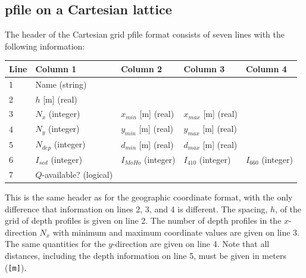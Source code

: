 \documentclass[11pt]{report}
\begin{document}
\subsection{pfile on a Cartesian lattice}
The header of the Cartesian grid pfile format consists of seven lines with the following information:
\begin{center}
\begin{tabular}{lllll}\hline
Line & Column 1& Column 2& Column 3& Column 4\\ \hline
1 & Name (string) & & & \\ \hline
2 & $h$ [m] (real) & & & \\ \hline
3 & $N_{x}$ (integer) & $x_{min}$ [m] (real) & $x_{max}$ [m] (real) & \\ \hline
4 & $N_{y}$ (integer) & $y_{min}$ [m] (real) & $y_{max}$ [m] (real) & \\ \hline
5 & $N_{dep}$ (integer) & $d_{min}$ [m] (real) & $d_{max}$ [m] (real) & \\ \hline
6 & $I_{sed}$ (integer) & $I_{MoHo}$ (integer) & $I_{410}$ (integer) & $I_{660}$ (integer) \\ \hline
7 & $Q$-available? (logical) \\ \hline
\end{tabular}
\end{center}
This is the same header as for the geographic coordinate format, with the only difference that information on
lines 2, 3, and 4 is different. The spacing, $h$, of the grid of depth profiles is given on line 2.
The number of depth profiles in the $x$-direction $N_x$ with minimum and maximum coordinate values
are given on line 3. The same quantities for the $y$-direction are given on line 4. Note that all 
distances, including the depth information on line 5, must be given in meters ({\tt [m]}).
\end{document}
